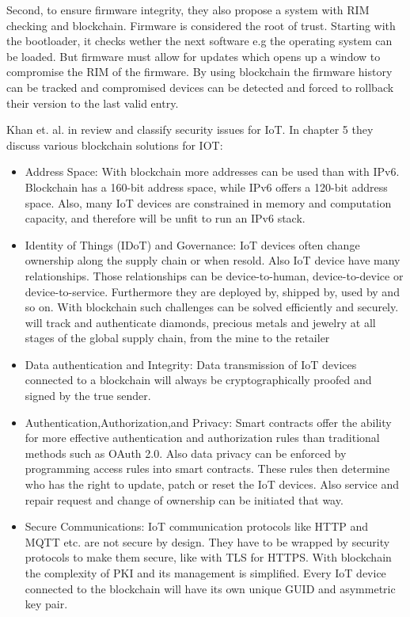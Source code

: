 Second, to ensure firmware integrity, they also propose a system with RIM checking and blockchain.
Firmware is considered the root of trust. Starting with the bootloader, it checks wether the next software e.g the operating system can be loaded.
But firmware must allow for updates which opens up a window to compromise the RIM of the firmware. By using blockchain the firmware history can be tracked and compromised devices can be detected and forced to rollback their
version to the last valid entry.

Khan et. al. in \cite{Khan2018} review and classify security issues for IoT.
In chapter 5 they discuss various blockchain solutions for IOT:

\begin{itemize}
  \item {Address Space: With blockchain more addresses can be used than with IPv6. Blockchain has a 160-bit address space, while IPv6 offers a 120-bit address space.
  Also, many IoT devices are constrained in memory and computation capacity, and therefore will be unfit to run an IPv6 stack.}
  \item {Identity of Things (IDoT) and Governance: IoT devices often change ownership along the supply chain or when resold. Also IoT device have many relationships. Those relationships can be device-to-human, device-to-device or device-to-service. Furthermore they are deployed by, shipped by, used by and so on. With blockchain such challenges can be solved efficiently and securely.
  will track and authenticate diamonds, precious metals and jewelry at all stages of the global supply chain, from the mine to the retailer}
  \item {Data authentication and Integrity: Data transmission of IoT devices connected to a blockchain will always be  cryptographically proofed and signed by the true sender.}
  \item {Authentication,Authorization,and Privacy: Smart contracts offer the ability for more effective authentication and authorization rules than traditional methods such as  OAuth 2.0. Also data privacy can be enforced by programming access rules into smart contracts. These rules then determine who has the right to update, patch or reset the IoT devices. Also service and repair request and change of ownership can be initiated that way. }
  \item {Secure Communications: IoT communication protocols like HTTP and MQTT etc. are not secure by design. They have to be wrapped by security protocols to make them secure, like with TLS for HTTPS.
  With blockchain the complexity of PKI and its management is simplified. Every IoT device connected to the blockchain will have its own unique GUID and asymmetric key pair. }
\end{itemize}


